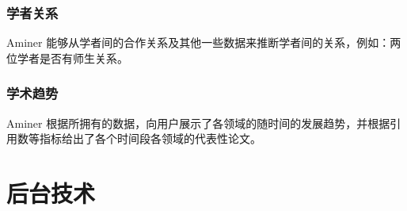 \documentclass[UTF8]{ctexbeamer}
\begin{document}
\begin{frame}
    \frametitle{学者关系}

    Aminer 能够从学者间的合作关系及其他一些数据来推断学者间的关系，例如：两位学者是否有师生关系。
    \cite{wang2010mining}


\end{frame}

\begin{frame}
    \frametitle{学术趋势}

    Aminer 根据所拥有的数据，向用户展示了各领域的随时间的发展趋势，并根据引用数等指标给出了各个时间段各领域的代表性论文。


\end{frame}




\section{后台技术}
\frame{\sectionpage}
\end{document}
